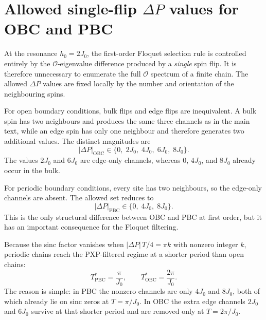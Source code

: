 \documentclass[aps,prb,reprint,twocolumn,amsmath,amssymb,citeautoscript]{revtex4-2}
\begin{document}

\section{Allowed single-flip $\Delta P$ values for OBC and PBC}
\label{app:Pnm}

At the resonance $h_0=2J_0$, the first-order Floquet selection rule is
controlled entirely by the $\mathcal{O}$-eigenvalue difference produced by
a \textit{single} spin flip. It is therefore unnecessary to enumerate the full
$\mathcal{O}$ spectrum of a finite chain. The allowed $\Delta P$ values are
fixed locally by the number and orientation of the neighbouring spins.

For open boundary conditions, bulk flips and edge flips are inequivalent.
A bulk spin has two neighbours and produces the same three channels as in the
main text, while an edge spin has only one neighbour and therefore generates
two additional values. The distinct magnitudes are
\begin{equation}
|\Delta P|_{\mathrm{OBC}}
\in
\{0,\;2J_0,\;4J_0,\;6J_0,\;8J_0\}.
\label{eq:app:DP_obc_set}
\end{equation}
The values $2J_0$ and $6J_0$ are edge-only channels, whereas
$0$, $4J_0$, and $8J_0$ already occur in the bulk.

For periodic boundary conditions, every site has two neighbours, so the
edge-only channels are absent. The allowed set reduces to
\begin{equation}
|\Delta P|_{\mathrm{PBC}}
\in
\{0,\;4J_0,\;8J_0\}.
\label{eq:app:DP_pbc_set}
\end{equation}
This is the only structural difference between OBC and PBC at first order,
but it has an important consequence for the Floquet filtering.

Because the sinc factor vanishes when $|\Delta P|\,T/4=\pi k$ with nonzero
integer $k$, periodic chains reach the PXP-filtered regime at a shorter
period than open chains:
\begin{equation}
T_{\mathrm{PBC}}^{\ast}=\frac{\pi}{J_0},
\qquad
T_{\mathrm{OBC}}^{\ast}=\frac{2\pi}{J_0}.
\label{eq:app:period_compare}
\end{equation}
The reason is simple: in PBC the nonzero channels are only $4J_0$ and $8J_0$,
both of which already lie on sinc zeros at $T=\pi/J_0$. In OBC the extra
edge channels $2J_0$ and $6J_0$ survive at that shorter period and are removed
only at $T=2\pi/J_0$.
\end{document}
